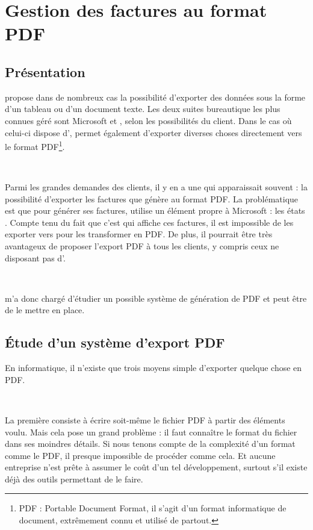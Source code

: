 \chapter{Gestion des factures au format PDF}
\section{Présentation}
\integrale{} propose dans de nombreux cas la possibilité d'exporter des données sous la forme d'un tableau ou d'un document texte. Les deux suites bureautique les plus connues géré sont Microsoft  et , selon les possibilités du client. Dans le cas où celui-ci dispose d', \integrale{} permet également d'exporter diverses choses directement vers le format PDF\footnote{PDF : Portable Document Format, il s'agit d'un format informatique de document, extrêmement connu et utilisé de partout.}.

~

Parmi les grandes demandes des clients, il y en a une qui apparaissait souvent : la possibilité d'exporter les factures que génère \integrale{} au format PDF. La problématique est que pour générer ses factures, \solulog{} utilise un élément propre à Microsoft  : les \og états \fg. Compte tenu du fait que c'est  qui affiche ces factures, il est impossible de les exporter vers  pour les transformer en PDF. De plus, il pourrait être très avantageux de proposer l'export PDF à tous les clients, y compris ceux ne disposant pas d'.

~

\solulog{} m'a donc chargé d'étudier un possible système de génération de PDF et peut être de le mettre en place.

\section{Étude d'un système d'export PDF}
En informatique, il n'existe que trois moyens \og simple \fg{} d'exporter quelque chose en PDF.

~

La première consiste à écrire soit-même le fichier PDF à partir des éléments voulu. Mais cela pose un grand problème : il faut connaître le format du fichier dans ses moindres détails. Si nous tenons compte de la complexité d'un format comme le PDF, il presque impossible de procéder comme cela. Et aucune entreprise n'est prête à assumer le coût d'un tel développement, surtout s'il existe déjà des outils permettant de le faire.

